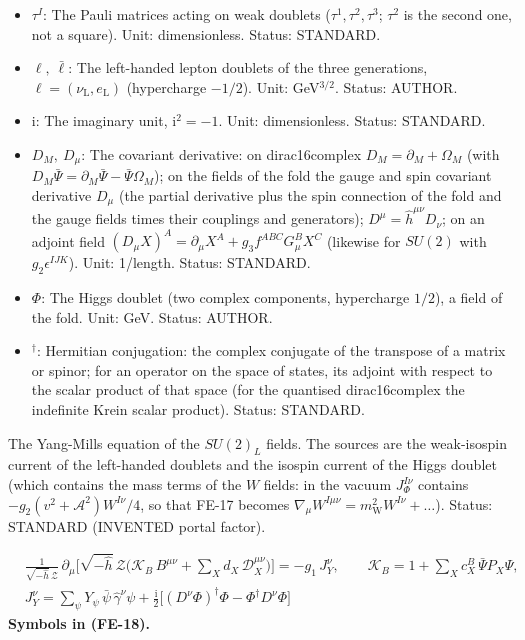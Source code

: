 \documentclass[
  10pt,
]{article}
\begin{document}
\begin{itemize}
\item
  \(\tau^I\): The Pauli matrices acting on weak doublets
  (\(\tau^1, \tau^2, \tau^3\); \(\tau^2\) is the second one, not a
  square). Unit: dimensionless. Status: STANDARD.
\item
  \(\ell,\ \bar\ell\): The left-handed lepton doublets of the three
  generations, \(\ell = (\nu_{\mathrm{L}}, e_{\mathrm{L}})\)
  (hypercharge \(-1/2\)). Unit: GeV\(^{3/2}\). Status: AUTHOR.
\item
  \(\mathrm{i}\): The imaginary unit, \(\mathrm{i}^2 = -1\). Unit:
  dimensionless. Status: STANDARD.
\item
  \(D_M,\ D_\mu\): The covariant derivative: on dirac16complex
  \(D_M = \partial_M + \Omega_M\) (with
  \(D_M\bar\Psi = \partial_M\bar\Psi - \bar\Psi\Omega_M\)); on the
  fields of the fold the gauge and spin covariant derivative \(D_\mu\)
  (the partial derivative plus the spin connection of the fold and the
  gauge fields times their couplings and generators);
  \(D^\mu = \hat h^{\mu\nu}D_\nu\); on an adjoint field
  \((D_\mu X)^A = \partial_\mu X^A + g_3f^{ABC}G^B_\mu X^C\) (likewise
  for \(SU(2)\) with \(g_2\epsilon^{IJK}\)). Unit: 1/length. Status:
  STANDARD.
\item
  \(\Phi\): The Higgs doublet (two complex components, hypercharge
  \(1/2\)), a field of the fold. Unit: GeV. Status: AUTHOR.
\item
  \({}^\dagger\): Hermitian conjugation: the complex conjugate of the
  transpose of a matrix or spinor; for an operator on the space of
  states, its adjoint with respect to the scalar product of that space
  (for the quantised dirac16complex the indefinite Krein scalar
  product). Status: STANDARD.
\end{itemize}

The Yang-Mills equation of the \(SU(2)_L\) fields. The sources are the
weak-isospin current of the left-handed doublets and the isospin current
of the Higgs doublet (which contains the mass terms of the \(W\) fields:
in the vacuum \(J_\Phi^{I\nu}\) contains
\(-g_2(v^2 + \mathcal{A}^2)W^{I\nu}/4\), so that FE-17 becomes
\(\nabla_\mu W^{I\mu\nu} = m_{\mathrm{W}}^2W^{I\nu} + \dots\)). Status:
STANDARD (INVENTED portal factor).

\[
\begin{aligned}
&\frac{1}{\sqrt{-\hat h}\,\mathcal{Z}}\,\partial_\mu\Big[\sqrt{-\hat h}\,\mathcal{Z}\Big(\mathcal{K}_{B}\,B^{\mu\nu}
 + \sum_X d_X\,\mathcal{D}_X^{\mu\nu}\Big)\Big] = -g_1\,J_Y^\nu,\qquad \mathcal{K}_{B} = 1 + \sum_X c^{B}_X\,\bar\Psi P_X\Psi,\\
&J_Y^\nu = \sum_\psi Y_\psi\,\bar\psi\,\hat\gamma^\nu\psi + \frac{\mathrm{i}}{2}\big[(D^\nu\Phi)^\dagger\Phi - \Phi^\dagger D^\nu\Phi\big]
\end{aligned} \tag{FE-18}
\] \textbf{Symbols in (FE-18).}
\end{document}
